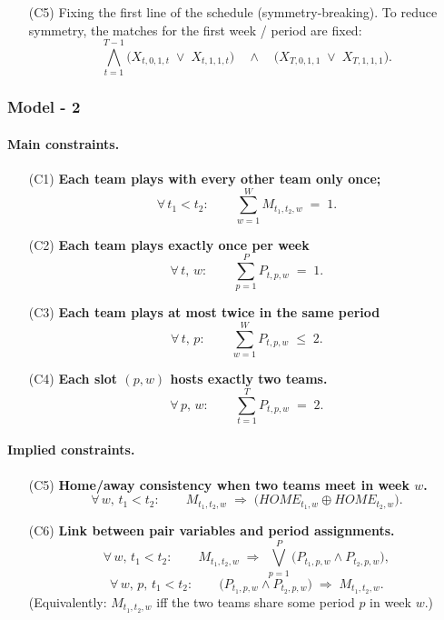 \documentclass{article}
\begin{document}
\begin{itemize}
\item[(C5)] {Fixing the first line of the schedule (symmetry-breaking).}  
To reduce symmetry, the matches for the first week / period are fixed:
\[
\bigwedge_{t=1}^{T-1} \big( X_{t,0,1,t} \;\lor\; X_{t,1,1,t} \big)
\quad\land\quad
\big( X_{T,0,1,1} \;\lor\; X_{T,1,1,1} \big).
\]
\end{itemize}

\subsubsection{Model - 2 }

\paragraph{Main constraints.}

\begin{itemize}
\item[(C1)] \textbf{Each team plays with every other team only once;}
\[
\forall\, t_1<t_2:\qquad
\sum_{w=1}^{W} M_{t_1,t_2,w} \;=\; 1.
\]

\item[(C2)] \textbf{Each team plays exactly once per week}
\[
\forall\, t,\,w:\qquad
\sum_{p=1}^{P} P_{t,p,w} \;=\; 1.
\]

\item[(C3)] \textbf{Each team plays at most twice in the same period}
\[
\forall\, t,\,p:\qquad
\sum_{w=1}^{W} P_{t,p,w} \;\le\; 2.
\]

\item[(C4)] \textbf{Each slot \((p,w)\) hosts exactly two teams.}
\[
\forall\, p,\,w:\qquad
\sum_{t=1}^{T} P_{t,p,w} \;=\; 2.
\]
\end{itemize}

\paragraph{Implied constraints.}

\begin{itemize}
\item[(C5)] \textbf{Home/away consistency when two teams meet in week \(w\).}
\[
\forall\, w,\, t_1<t_2:\qquad
M_{t_1,t_2,w} \;\Rightarrow\; \big(HOME_{t_1,w} \oplus HOME_{t_2,w}\big).
\]

\item[(C6)] \textbf{Link between pair variables and period assignments.}
\[
\forall\, w,\, t_1<t_2:\qquad
M_{t_1,t_2,w} \;\Rightarrow\; \bigvee_{p=1}^{P}\big(P_{t_1,p,w}\land P_{t_2,p,w}\big),
\]
\[
\forall\, w,\,p,\, t_1<t_2:\qquad
\big(P_{t_1,p,w}\land P_{t_2,p,w}\big) \;\Rightarrow\; M_{t_1,t_2,w}.
\]
(Equivalently: \(M_{t_1,t_2,w}\) iff the two teams share some period \(p\) in week \(w\).)
\end{itemize}
\end{document}

